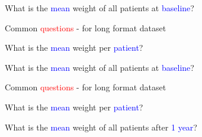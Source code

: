 \documentclass{presentatiesmetlogo}
\newcommand{\code}[1]{\textcolor{blue}{\texttt{#1}}}
\newcommand{\R}{{\textsf{R} }}
\let \nl = \newline
\begin{document}
\item What is the \textcolor{blue}{mean} weight of all patients at \textcolor{blue}{baseline}?
\eitemt
\eitem
\bitem
\item Common \textcolor{red}{questions} - for long format dataset
\newline
\bitemt
\item What is the \textcolor{blue}{mean} weight per \textcolor{blue}{patient}?
\item {}
\item What is the \textcolor{blue}{mean} weight of all patients at \textcolor{blue}{baseline}?
\eitemt
\eitem
\bitem
\item Common \textcolor{red}{questions} - for long format dataset
\newline
\bitemt
\item What is the \textcolor{blue}{mean} weight per \textcolor{blue}{patient}?
\item What is the \textcolor{blue}{mean} weight of all patients after \textcolor{blue}{1 year}?
\item {}
\eitemt
\eitem
\end{document}
